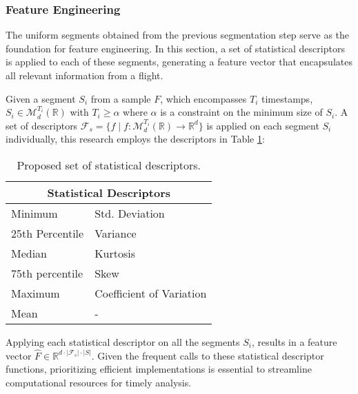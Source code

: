 \documentclass{IEEEtran}
\begin{document}
            \subsubsection{Feature Engineering}

                The uniform segments obtained from the previous segmentation step serve as the foundation for feature engineering. In this section, a set of statistical descriptors is applied to each of these segments, generating a feature vector that encapsulates all relevant information from a flight.

                Given a segment $S_{i}$ from a sample $F$, which encompasses $T_i$ timestamps, $S_i \in \mathcal{M}_{d}^{T_i}(\mathbb{R})$ with $T_i \geq \alpha$ where $\alpha$ is a constraint on the minimum size of $S_i$. A set of descriptors $\mathcal{F}_s = \{f \mid  f: \mathcal{M}_{d}^{T_i}(\mathbb{R}) \rightarrow \mathbb{R}^{d}\}$ is applied on each segment $S_i$ individually, this research employs the descriptors in Table \ref{tab:stat_descriptors}:
                \begin{table}[!htbp]
                    \centering
                    \caption{Proposed set of statistical descriptors.}
                    \label{tab:stat_descriptors}
                    \begin{tabular}{ll}
                        \toprule
                        \multicolumn{2}{c}{Statistical Descriptors} \\
                        \midrule
                        Minimum & Std. Deviation \\
                        25th Percentile & Variance \\
                        Median & Kurtosis \\
                        75th percentile & Skew \\
                        Maximum & Coefficient of Variation \\
                        Mean & - \\
                        \bottomrule
                    \end{tabular}
                \end{table}

                Applying each statistical descriptor on all the segments $S_i$, results in a feature vector $\hat{F} \in \mathbb{R}^{d \cdot |\mathcal{F}_s| \cdot |S| }$. Given the frequent calls to these statistical descriptor functions, prioritizing efficient implementations is essential to streamline computational resources for timely analysis.
\end{document}
